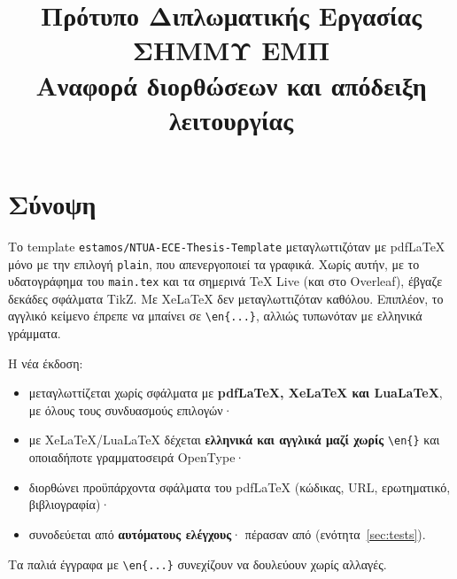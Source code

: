 \documentclass[a4paper,11pt]{article}
\title{\textbf{Πρότυπο Διπλωματικής Εργασίας ΣΗΜΜΥ ΕΜΠ}\\[4pt]
	\large Αναφορά διορθώσεων και απόδειξη λειτουργίας}
\begin{document}
\maketitle

\section{Σύνοψη}
Το template \texttt{estamos/NTUA-ECE-Thesis-Template} μεταγλωττιζόταν με
pdfLaTeX μόνο με την επιλογή \texttt{plain}, που απενεργοποιεί τα γραφικά.
Χωρίς αυτήν, με το υδατογράφημα του \texttt{main.tex} και τα σημερινά TeX Live
(και στο Overleaf), έβγαζε δεκάδες σφάλματα TikZ.
Με XeLaTeX δεν μεταγλωττιζόταν καθόλου. Επιπλέον, το αγγλικό κείμενο έπρεπε
να μπαίνει σε \verb|\en{...}|, αλλιώς τυπωνόταν με ελληνικά γράμματα.

Η νέα έκδοση:
\begin{itemize}
	\item μεταγλωττίζεται χωρίς σφάλματα με \textbf{pdfLaTeX, XeLaTeX και LuaLaTeX},
		με όλους τους συνδυασμούς επιλογών·
	\item με XeLaTeX/LuaLaTeX δέχεται \textbf{ελληνικά και αγγλικά μαζί χωρίς}
		\verb|\en{}| και οποιαδήποτε γραμματοσειρά OpenType·
	\item διορθώνει προϋπάρχοντα σφάλματα του pdfLaTeX (κώδικας, URL,
		ερωτηματικό, βιβλιογραφία)·
	\item συνοδεύεται από \textbf{\testcount{} αυτόματους ελέγχους}·
		πέρασαν \testpassed{} από \testcount{} (ενότητα~\ref{sec:tests}).
\end{itemize}
Τα παλιά έγγραφα με \verb|\en{...}| συνεχίζουν να δουλεύουν χωρίς αλλαγές.
\end{document}
